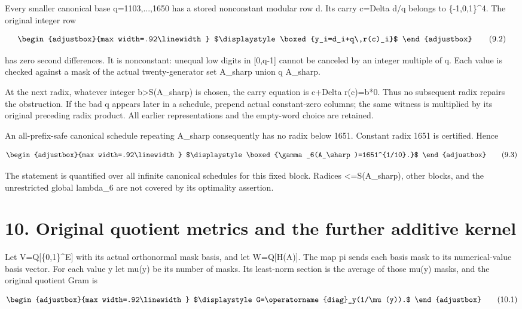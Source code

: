 Every smaller canonical base q=1103,...,1650 has a stored nonconstant modular row d. Its carry c=Delta d/q belongs to \{-1,0,1\}\^{}4. The original integer row

\[
\begin{adjustbox}{max width=.92\linewidth}
$\displaystyle \boxed{y_i=d_i+q\,r(c)_i}$
\end{adjustbox}
\tag{9.2}
\]

has zero second differences. It is nonconstant: unequal low digits in {[}0,q-1{]} cannot be canceled by an integer multiple of q. Each value is checked against a mask of the actual twenty-generator set A\_sharp union q A\_sharp.

At the next radix, whatever integer b\textgreater S(A\_sharp) is chosen, the carry equation is c+Delta r(c)=b*0. Thus no subsequent radix repairs the obstruction. If the bad q appears later in a schedule, prepend actual constant-zero columns; the same witness is multiplied by its original preceding radix product. All earlier representations and the empty-word choice are retained.

An all-prefix-safe canonical schedule repeating A\_sharp consequently has no radix below 1651. Constant radix 1651 is certified. Hence

\[
\begin{adjustbox}{max width=.92\linewidth}
$\displaystyle \boxed{\gamma_6(A_\sharp)=1651^{1/10}.}$
\end{adjustbox}
\tag{9.3}
\]

The statement is quantified over all infinite canonical schedules for this fixed block. Radices \textless=S(A\_sharp), other blocks, and the unrestricted global lambda\_6 are not covered by its optimality assertion.

\section{10. Original quotient metrics and the further additive kernel}\label{n08-original-quotient-metrics-and-the-further-additive-kernel}

Let V=Q{[}\{0,1\}\^{}E{]} with its actual orthonormal mask basis, and let W=Q{[}H(A){]}. The map pi sends each basis mask to its numerical-value basis vector. For each value y let mu(y) be its number of masks. Its least-norm section is the average of those mu(y) masks, and the original quotient Gram is

\[
\begin{adjustbox}{max width=.92\linewidth}
$\displaystyle G=\operatorname{diag}_y(1/\mu(y)).$
\end{adjustbox}
\tag{10.1}
\]

